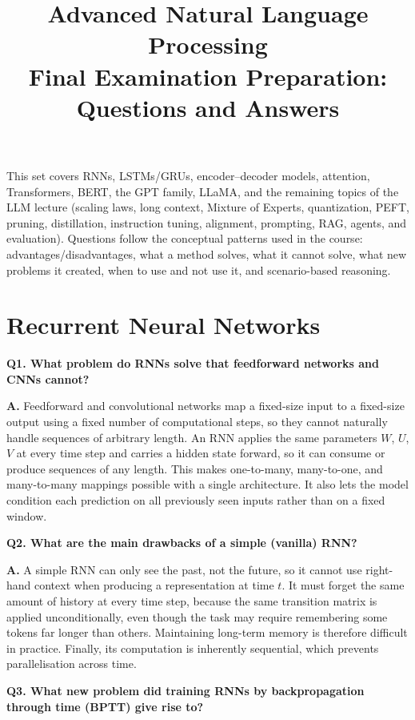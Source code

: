 \documentclass[11pt]{article}
\title{Advanced Natural Language Processing\\Final Examination Preparation: Questions and Answers}
\author{}
\date{}
\begin{document}
\maketitle

This set covers RNNs, LSTMs/GRUs, encoder--decoder models, attention, Transformers, BERT, the GPT family, LLaMA, and the remaining topics of the LLM lecture (scaling laws, long context, Mixture of Experts, quantization, PEFT, pruning, distillation, instruction tuning, alignment, prompting, RAG, agents, and evaluation). Questions follow the conceptual patterns used in the course: advantages/disadvantages, what a method solves, what it cannot solve, what new problems it created, when to use and not use it, and scenario-based reasoning.

\tableofcontents

\section{Recurrent Neural Networks}

\noindent\textbf{Q1. What problem do RNNs solve that feedforward networks and CNNs cannot?}

\noindent\textbf{A.} Feedforward and convolutional networks map a fixed-size input to a fixed-size output using a fixed number of computational steps, so they cannot naturally handle sequences of arbitrary length. An RNN applies the same parameters $W$, $U$, $V$ at every time step and carries a hidden state forward, so it can consume or produce sequences of any length. This makes one-to-many, many-to-one, and many-to-many mappings possible with a single architecture. It also lets the model condition each prediction on all previously seen inputs rather than on a fixed window.

\medskip
\noindent\textbf{Q2. What are the main drawbacks of a simple (vanilla) RNN?}

\noindent\textbf{A.} A simple RNN can only see the past, not the future, so it cannot use right-hand context when producing a representation at time $t$. It must forget the same amount of history at every time step, because the same transition matrix is applied unconditionally, even though the task may require remembering some tokens far longer than others. Maintaining long-term memory is therefore difficult in practice. Finally, its computation is inherently sequential, which prevents parallelisation across time.

\medskip
\noindent\textbf{Q3. What new problem did training RNNs by backpropagation through time (BPTT) give rise to?}
\end{document}
